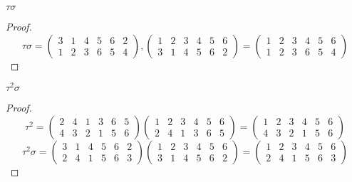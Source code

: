 \begin{exercise}
    $\tau\sigma$
\end{exercise}

\begin{proof}
    \[
        \tau\sigma =
        \begin{pmatrix}
            3 & 1 & 4 & 5 & 6 & 2 \\
            1 & 2 & 3 & 6 & 5 & 4
        \end{pmatrix},
        \begin{pmatrix}
            1 & 2 & 3 & 4 & 5 & 6 \\
            3 & 1 & 4 & 5 & 6 & 2
        \end{pmatrix} =
        \begin{pmatrix}
            1 & 2 & 3 & 4 & 5 & 6 \\
            1 & 2 & 3 & 6 & 5 & 4
        \end{pmatrix}
    \]
\end{proof}

\begin{exercise}
    ${\tau}^{2}\sigma$
\end{exercise}

\begin{proof}
    \[
        {\tau}^{2} =
        \begin{pmatrix}
            2 & 4 & 1 & 3 & 6 & 5 \\
            4 & 3 & 2 & 1 & 5 & 6
        \end{pmatrix}
        \begin{pmatrix}
            1 & 2 & 3 & 4 & 5 & 6 \\
            2 & 4 & 1 & 3 & 6 & 5
        \end{pmatrix} =
        \begin{pmatrix}
            1 & 2 & 3 & 4 & 5 & 6 \\
            4 & 3 & 2 & 1 & 5 & 6
        \end{pmatrix}
    \]
    \[
        {\tau}^{2}\sigma =
        \begin{pmatrix}
            3 & 1 & 4 & 5 & 6 & 2 \\
            2 & 4 & 1 & 5 & 6 & 3
        \end{pmatrix}
        \begin{pmatrix}
            1 & 2 & 3 & 4 & 5 & 6 \\
            3 & 1 & 4 & 5 & 6 & 2
        \end{pmatrix} =
        \begin{pmatrix}
            1 & 2 & 3 & 4 & 5 & 6 \\
            2 & 4 & 1 & 5 & 6 & 3
        \end{pmatrix}
    \]
\end{proof}

